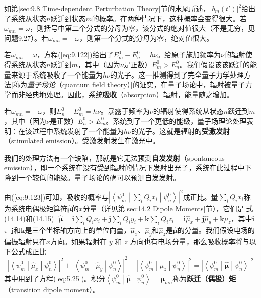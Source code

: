     如第\ref{sec:9.8 Time-dependent Perturbation Theory}节的末尾所述，$\left|b_m\left(t'\right)\right|^2$给出了系统从状态$n$跃迁到状态$m$的概率。在两种情况下，这种概率会变得很大。若$\omega_{mn} = \omega$，则括号中第二个分式的分母为零，该分式的绝对值很大（不是无穷，见问题9.27）。若$\omega_{mn} = -\omega$，则第一个分式的分母为零，绝对值很大。

    若$\omega_{mn} = \omega$，方程(\ref{eq:9.122})给出了$E_m^0 - E_n^0 = h\nu$。给原子施加频率为$\nu$的辐射使得系统从状态$n$跃迁到$m$，其中（因为$\nu$是正数）$E_m^0 > E_n^0$。我们假设该该跃迁的能量来源于系统吸收了一个能量为$h\nu$的光子。这一推测得到了完全量子力学处理方法[称为\textit{量子场论}（quantum field theory）]的证实，在量子场论中，辐射被量子力学而非经典地处理。因此，系统\textbf{吸收}（absorption）辐射，能量随之增加。

    若$\omega_{mn} = -\omega$，则$E_n^0 - E_m^0 = h\nu$。暴露于频率为$\nu$的辐射使得系统从状态$n$跃迁到$m$，其中（因为$\nu$是正数）$E_n^0 > E_m^0$。系统到了一个更低的能级，量子场理论处理表明：在该过程中系统发射了一个能量为$h\nu$的光子。这就是辐射的\textbf{受激发射}（stimulated emission）。受激发射发生在激光中。

    我们的处理方法有一个缺陷，那就是它无法预测\textbf{自发发射}（spontaneous emission），即一个系统在没有受到辐射的情况下发射出光子，系统在此过程中下降到一个较低的能级。量子场论的确可以预测自发发射。

    由(\ref{eq:9.123})可知，吸收的概率与$\left|\left\langle \psi_m^0 \middle| \sum_i Q_i x_i \middle| \psi_n^0 \right\rangle\right|^2$成正比。量$\sum_iQ_ix_i$称为系统电偶极矩算符$\hat{\symbf{\mu}}$的$x$分量（详见第\ref{sec:14.2 Dipole Moments}节），它们是[式(14.14)和(14.15)]
    $\hat{\symbf{\mu}} = \mathbf{i}\sum_i Q_i x_i + \mathbf{j}\sum_i Q_i y_i + \mathbf{k}\sum_i Q_i z_i = \mathbf{i}\hat{\mu}_x + \mathbf{j}\hat{\mu}_y + \mathbf{k}\hat{\mu}_z$，其中$\mathbf{i}$、$\mathbf{j}$和$\mathbf{k}$是三个坐标轴方向上的单位向量，$\hat{\mu}_x$、$\hat{\mu}_y$和$\hat{\mu}_z$是$\symbf{\hat{\mu}}$的分量。我们假设电场的偏振辐射只在$x$方向。如果辐射在 $y$ 和 $z$ 方向也有电场分量，那么吸收概率将与以下公式成正比
    \begin{equation*}
        \left|\left\langle \psi_m^0 \middle| \hat{\mu}_x \middle| \psi_n^0 \right\rangle\right|^2 + \left|\left\langle \psi_m^0 \middle| \hat{\mu}_y \middle| \psi_n^0 \right\rangle\right|^2 + \left|\left\langle \psi_m^0 \middle| \hat{\mu}_z \middle| \psi_n^0 \right\rangle\right|^2 = \left|\left\langle \psi_m^0 \middle| \hat{\symbf{\mu}} \middle| \psi_n^0 \right\rangle\right|^2
    \end{equation*}
    其中用到了方程(\ref{eq:5.25})。积分$\left\langle \psi_m^0 \middle| \symbf{\hat{\mu}} \middle| \psi_n^0 \right\rangle = \symbf{\mu}_{mn}$称为\textbf{跃迁（偶极）矩}（transition dipole moment）。

